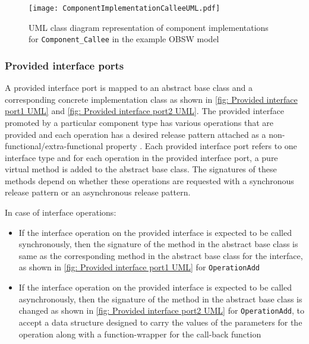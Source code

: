 \begin{figure}[h]
	\centering
	\texttt{[image: ComponentImplementationCalleeUML.pdf]}
	\caption{UML class diagram representation of component implementations for \texttt{Component\_\allowbreak Callee} in the example OBSW model}
	\label{fig: Component implementation Callee UML}
\end{figure}

\subsubsection{\textbf{Provided interface ports}}
A provided interface port is mapped to an abstract base class and a corresponding concrete implementation class as shown in \cref{fig: Provided interface port1 UML} and \cref{fig: Provided interface port2 UML}. The provided interface promoted by a particular component type has various operations that are provided and each operation has a desired release pattern attached as a non-functional/extra-functional property \cite{SpecMetamodel}\cite{CompBasedProcess}. Each provided interface port refers to one interface type and for each operation in the provided interface port, a pure virtual method is added to the abstract base class. The signatures of these methods depend on whether these operations are requested with a synchronous release pattern or an asynchronous release pattern.

In case of interface operations:
\begin{itemize}
\item If the interface operation on the provided interface is expected to be called synchronously, then the signature of the method in the abstract base class is same as the corresponding method in the abstract base class for the interface, as shown in \cref{fig: Provided interface port1 UML} for \texttt{OperationAdd}
\item If the interface operation on the provided interface is expected to be called asynchronously, then the signature of the method in the abstract base class is changed as shown in \cref{fig: Provided interface port2 UML} for \texttt{OperationAdd}, to accept a data structure designed to carry the values of the parameters for the operation along with a function-wrapper for the call-back function     
\end{itemize}   

